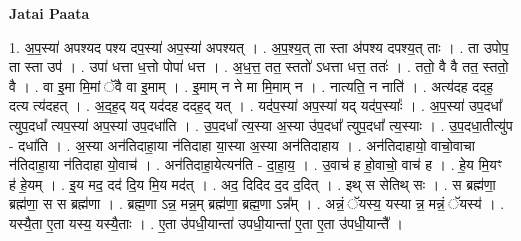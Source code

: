 \documentclass[17pt]{extarticle}
\begin{document}
\textbf{Jatai Paata} \newline

1. अ॒प॒स्या॑ अपश्यद पश्य दप॒स्या॑ अप॒स्या॑ अपश्यत् । . अ॒प॒श्य॒त् ता स्ता अ॑पश्य दपश्य॒त् ताः । . ता उपोप॒ ता स्ता उप॑ । . उपा॑ धत्ता ध॒त्तो पोपा॑ धत्त । . अ॒ध॒त्त॒ तत॒ स्ततो॑ ऽधत्ता धत्त॒ ततः॑ । . ततो॒ वै वै तत॒ स्ततो॒ वै । . वा इ॒मा मि॒मां ॅवै वा इ॒माम् । . इ॒माम् न ने मा मि॒माम् न । . नात्यति॒ न नाति॑ । . अत्य॑दह ददह॒ दत्य त्य॑दहत् । . अ॒द॒ह॒द् यद् यद॑दह ददह॒द् यत् । . यद॑प॒स्या॑ अप॒स्या॑ यद् यद॑प॒स्याः᳚ । . अ॒प॒स्या॑ उप॒दधा᳚ त्युप॒दधा᳚ त्यप॒स्या॑ अप॒स्या॑ उप॒दधा॑ति । . उ॒प॒दधा᳚ त्य॒स्या अ॒स्या उ॑प॒दधा᳚ त्युप॒दधा᳚ त्य॒स्याः । . उ॒प॒दधा॒तीत्यु॑प - दधा॑ति । . अ॒स्या अन॑तिदाहा॒या न॑तिदाहा या॒स्या अ॒स्या अन॑तिदाहाय । . अन॑तिदाहायो॒ वाचो॒वाचा न॑तिदाहा॒या न॑तिदाहा यो॒वाच॑ । . अन॑तिदाहा॒येत्यन॑ति - दा॒हा॒य॒ । . उ॒वाच॑ ह हो॒वाचो॒ वाच॑ ह । . हे॒य मि॒यꣳ ह॑ हे॒यम् । . इ॒य मद॒ दद॑ दि॒य मि॒य मद॑त् । . अद॒ दिदिद द॒द द॒दित् । . इथ् स सेतिथ् सः । . स ब्रह्म॑णा॒ ब्रह्म॑णा॒ स स ब्रह्म॑णा । . ब्रह्म॒णा ऽन्न॒ मन्न॒म् ब्रह्म॑णा॒ ब्रह्म॒णा ऽन्न᳚म् । . अन्नं॒ ॅयस्य॒ यस्या न्न॒ मन्नं॒ ॅयस्य॑ । . यस्यै॒ता ए॒ता यस्य॒ यस्यै॒ताः । . ए॒ता उ॑पधी॒यान्ता॑ उपधी॒यान्ता॑ ए॒ता ए॒ता उ॑पधी॒यान्तै᳚ । \newline
\end{document}
